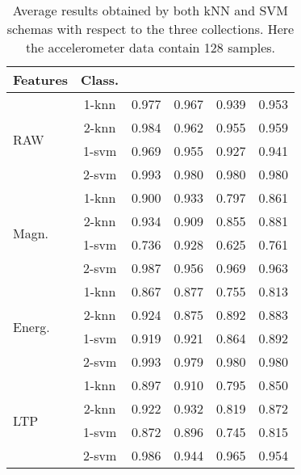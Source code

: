 \documentclass[twocolumn]{svjour3}          \smartqed  \usepackage[draft]{hyperref}
\begin{document}
 
 \begin{table}[tb]
\scriptsize
\centering
\begin{tabular}{lccccc}
	Features&Class.	&	 &	 &		&	 \\
\hline \multirow{4}{*}{RAW}	&1-knn&	0.977&	0.967&	0.939&	0.953\\ 
&2-knn&	0.984&	0.962&	0.955&	0.959\\ 
&1-svm&	0.969&	0.955&	0.927&	0.941\\ 
&2-svm&	0.993&	0.980&	0.980&	0.980\\ 
[2pt] 
\hline 
\multirow{4}{*}{Magn.}	&1-knn&	0.900&	0.933&	0.797&	0.861\\ 
&2-knn&	0.934&	0.909&	0.855&	0.881\\ 
&1-svm&	0.736&	0.928&	0.625&	0.761\\ 
&2-svm&	0.987&	0.956&	0.969&	0.963\\ 
[2pt] 
\hline 
\multirow{4}{*}{Energ.}	&1-knn&	0.867&	0.877&	0.755&	0.813\\ 
&2-knn&	0.924&	0.875&	0.892&	0.883\\ 
&1-svm&	0.919&	0.921&	0.864&	0.892\\ 
&2-svm&	0.993&	0.979&	0.980&	0.980\\ 
[2pt] 
\hline 
\multirow{4}{*}{LTP}	&1-knn&	0.897&	0.910&	0.795&	0.850\\ 
&2-knn&	0.922&	0.932&	0.819&	0.872\\ 
&1-svm&	0.872&	0.896&	0.745&	0.815\\ 
&2-svm&	0.986&	0.944&	0.965&	0.954\\ 
[2pt] 
\hline  
\end{tabular}
\medskip
\caption{Average results obtained by both kNN and SVM schemas with respect to the three collections. Here the accelerometer data contain 128 samples.}
\label{table:summary-1-128}
 \end{table}
 
\end{document}
